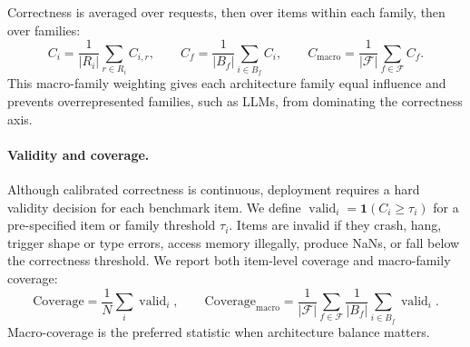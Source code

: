 Correctness is averaged over requests, then over items within each family, then over families:
\begin{equation}
C_i = \frac{1}{|R_i|}\sum_{r \in R_i} C_{i,r},
\qquad
C_f = \frac{1}{|B_f|}\sum_{i \in B_f} C_i,
\qquad
C_{\mathrm{macro}} = \frac{1}{|\mathcal{F}|}\sum_{f \in \mathcal{F}} C_f.
\end{equation}
This macro-family weighting gives each architecture family equal influence and prevents overrepresented families, such as LLMs, from dominating the correctness axis.

\paragraph{Validity and coverage.}
Although calibrated correctness is continuous, deployment requires a hard validity decision for each benchmark item.
We define $\operatorname{valid}_i = \mathbf{1}(C_i \ge \tau_i)$ for a pre-specified item or family threshold $\tau_i$.
Items are invalid if they crash, hang, trigger shape or type errors, access memory illegally, produce NaNs, or fall below the correctness threshold.
We report both item-level coverage and macro-family coverage:
\begin{equation}
\mathrm{Coverage} = \frac{1}{N}\sum_i \operatorname{valid}_i,
\qquad
\mathrm{Coverage}_{\mathrm{macro}} =
\frac{1}{|\mathcal{F}|}\sum_{f \in \mathcal{F}}
\frac{1}{|B_f|}\sum_{i \in B_f}\operatorname{valid}_i.
\end{equation}
Macro-coverage is the preferred statistic when architecture balance matters.

